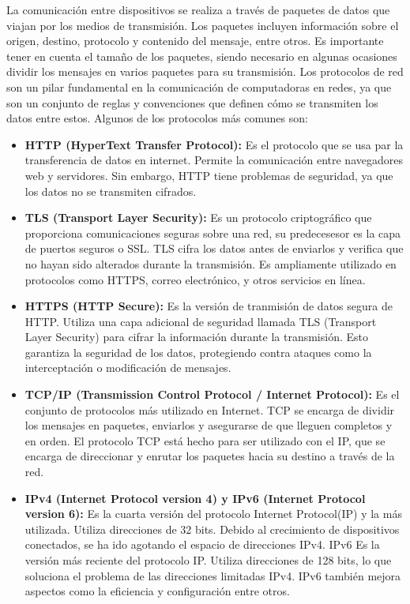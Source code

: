 La comunicación entre dispositivos se realiza a través de paquetes de datos que viajan por los medios de transmisión. Los paquetes incluyen información sobre el origen, destino, protocolo y contenido del mensaje, entre otros. Es importante tener en cuenta el tamaño de los paquetes, siendo necesario en algunas ocasiones dividir los mensajes en varios paquetes para su transmisión.
Los protocolos de red son un pilar fundamental en la comunicación de computadoras en redes, ya que son un conjunto de reglas y convenciones que definen cómo se transmiten los datos entre estos.
Algunos de los protocolos más comunes son:
\begin{itemize}
	\item \textbf{HTTP (HyperText Transfer Protocol):} Es el protocolo que se usa par la transferencia de datos en internet. Permite la comunicación entre navegadores web y servidores. Sin embargo, HTTP tiene problemas de seguridad, ya que los datos no se transmiten cifrados.
	\item \textbf{TLS (Transport Layer Security):} Es un protocolo criptográfico que proporciona comunicaciones seguras sobre una red, su predecesesor es la capa de puertos seguros o SSL. TLS cifra los datos antes de enviarlos y verifica que no hayan sido alterados durante la transmisión. Es ampliamente utilizado en protocolos como HTTPS, correo electrónico, y otros servicios en línea. ~\cite{SushilJajodia2025}

	\item \textbf{HTTPS (HTTP Secure):} Es la versión de tranmisión de datos segura de HTTP. Utiliza una capa adicional de seguridad llamada TLS (Transport Layer Security) para cifrar la información durante la transmisión. Esto garantiza la seguridad de los datos, protegiendo contra ataques como la interceptación o modificación de mensajes. ~\cite{SushilJajodia2025}

	\item \textbf{TCP/IP (Transmission Control Protocol / Internet Protocol):} Es el conjunto de protocolos más utilizado en Internet. TCP se encarga de dividir los mensajes en paquetes, enviarlos y asegurarse de que lleguen completos y en orden. El protocolo TCP está hecho para ser utilizado con el IP, que se encarga de direccionar y enrutar los paquetes hacia su destino a través de la red.~\cite{Protocolo}

	\item \textbf{IPv4 (Internet Protocol version 4) y IPv6 (Internet Protocol version 6):} Es la cuarta versión del protocolo Internet Protocol(IP) y la más utilizada. Utiliza direcciones de 32 bits. Debido al crecimiento de dispositivos conectados, se ha ido agotando el espacio de direcciones IPv4.
	IPv6 Es la versión más reciente del protocolo IP. Utiliza direcciones de 128 bits, lo que soluciona el problema de las direcciones limitadas IPv4. IPv6 también mejora aspectos como la eficiencia y configuración entre otros.


\end{itemize}

